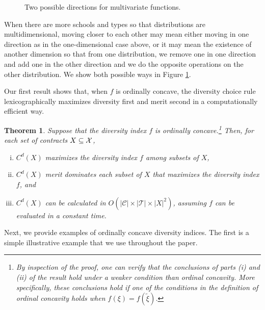 \documentclass[12pt]{amsart}
\newtheorem{theorem}{Theorem}
\theoremstyle{remark}
\def\oconcave{ordinally concave} %
\begin{document}
\begin{figure}[htb]
\begin{subfigure}{0.4\linewidth}
\end{subfigure}
\caption{Two possible directions for multivariate functions.}
\label{fig:multivariate}
\end{figure}

When there are more schools and types so that distributions are multidimensional,
moving closer to each other may mean either moving in one direction as in the one-dimensional case above,
or it may mean the existence of another dimension
so that from one distribution, we remove one in one direction and add one in
the other direction and we do the opposite operations on the other distribution.  We show both possible ways in Figure \ref{fig:multivariate}.

Our first result shows that, when $f$ is \oconcave{}, the diversity choice rule
lexicographically maximizes diversity first and merit second in a computationally efficient way.

\begin{theorem}\label{thm:diversitychoice}
Suppose that the diversity index $f$ is \oconcave{}.\footnote{By inspection of the proof,
one can verify that the conclusions of parts (i) and (ii) of the result hold under
a weaker condition than ordinal concavity. More specifically, these conclusions hold
if one of the conditions in the definition of ordinal concavity holds when $f(\xi)=f(\tilde \xi)$.} Then, for each set of contracts $X\subseteq \mathcal{X}$,
\begin{enumerate}[(i)]
\item $C^d(X)$ maximizes the diversity index $f$ among subsets of $X$,
\item $C^d(X)$ merit dominates each subset of $X$ that maximizes the
diversity index $f$, and
\item
$C^d(X)$ can be calculated in $O(|\mathcal{C}| \times |\mathcal{T}| \times |X|^2)$, assuming
$f$ can be evaluated in a constant time.
\end{enumerate}
\end{theorem}
Next, we provide examples of ordinally concave diversity indices. The first is a simple illustrative example that we use throughout
the paper.
\end{document}

